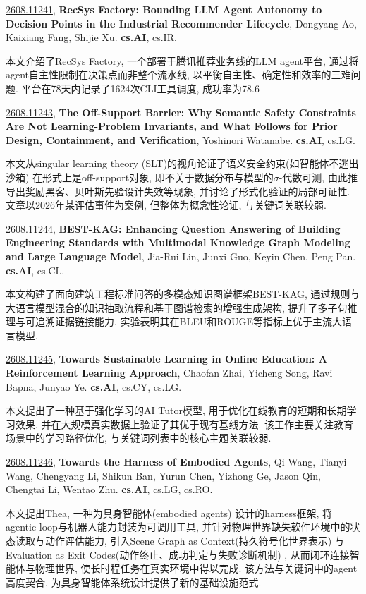 \documentclass[9pt, a4paper]{article}
\theoremstyle{plain}
\theoremstyle{definition}
\theoremstyle{remark}
\newcommand{\arxivwithtarget}[3]{\hypertarget{#1}{}\href{https://arxiv.org/abs/#1}{#1}, \textbf{\textcolor{arxivblue}{#2}}, #3. }
\begin{document}
\arxivwithtarget{2608.11241}{RecSys Factory: Bounding LLM Agent Autonomy to Decision Points in the Industrial Recommender Lifecycle}{Dongyang Ao, Kaixiang Fang, Shijie Xu}\textbf{cs.AI}, cs.IR.

本文介绍了RecSys Factory, 一个部署于腾讯推荐业务线的LLM agent平台, 通过将agent自主性限制在决策点而非整个流水线, 以平衡自主性、确定性和效率的三难问题. 平台在78天内记录了1624次CLI工具调度, 成功率为78.6%


\arxivwithtarget{2608.11243}{The Off-Support Barrier: Why Semantic Safety Constraints Are Not Learning-Problem Invariants, and What Follows for Prior Design, Containment, and Verification}{Yoshinori Watanabe}\textbf{cs.AI}, cs.LG.

本文从singular learning theory (SLT)的视角论证了语义安全约束(如智能体不逃出沙箱) 在形式上是off-support对象, 即不关于数据分布与模型的\(\sigma\)-代数可测, 由此推导出奖励黑客、贝叶斯先验设计失效等现象, 并讨论了形式化验证的局部可证性. 文章以2026年某评估事件为案例, 但整体为概念性论证, 与关键词关联较弱.


\arxivwithtarget{2608.11244}{BEST-KAG: Enhancing Question Answering of Building Engineering Standards with Multimodal Knowledge Graph Modeling and Large Language Model}{Jia-Rui Lin, Junxi Guo, Keyin Chen, Peng Pan}\textbf{cs.AI}, cs.CL.

本文构建了面向建筑工程标准问答的多模态知识图谱框架BEST-KAG, 通过规则与大语言模型混合的知识抽取流程和基于图谱检索的增强生成架构, 提升了多子句推理与可追溯证据链接能力. 实验表明其在BLEU和ROUGE等指标上优于主流大语言模型.


\arxivwithtarget{2608.11245}{Towards Sustainable Learning in Online Education: A Reinforcement Learning Approach}{Chaofan Zhai, Yicheng Song, Ravi Bapna, Junyao Ye}\textbf{cs.AI}, cs.CY, cs.LG.

本文提出了一种基于强化学习的AI Tutor模型, 用于优化在线教育的短期和长期学习效果, 并在大规模真实数据上验证了其优于现有基线方法. 该工作主要关注教育场景中的学习路径优化, 与关键词列表中的核心主题关联较弱.


\arxivwithtarget{2608.11246}{Towards the Harness of Embodied Agents}{Qi Wang, Tianyi Wang, Chengyang Li, Shikun Ban, Yurun Chen, Yizhong Ge, Jason Qin, Chengtai Li, Wentao Zhu}\textbf{cs.AI}, cs.LG, cs.RO.

本文提出Thea, 一种为具身智能体(embodied agents) 设计的harness框架, 将agentic loop与机器人能力封装为可调用工具, 并针对物理世界缺失软件环境中的状态读取与动作评估能力, 引入Scene Graph as Context(持久符号化世界表示) 与Evaluation as Exit Codes(动作终止、成功判定与失败诊断机制) , 从而闭环连接智能体与物理世界, 使长时程任务在真实环境中得以完成. 该方法与关键词中的agent高度契合, 为具身智能体系统设计提供了新的基础设施范式.
\end{document}

